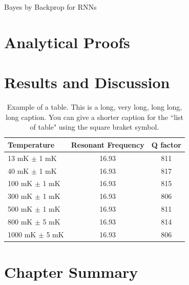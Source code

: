 \begin{algorithm}[ht]
	\caption{Bayes by Backprop for RNNs}
	\label{alg:rnnbbb}
	\begin{algorithmic}
	\end{algorithmic}
\end{algorithm}

\section{Analytical Proofs}


\section{Results and Discussion}


\begin{table}[p]
	\centering
	\caption[Short version of the caption.]{Example of a table. This is a long, very long, long long, long caption.  You can give a shorter caption for the ``list of table" using the square braket symbol.}
	\vspace{\baselineskip}
	\begin{tabular}{l c c}
		\hline
		\hline
		Temperature & Resonant Frequency & Q factor\\
		\hline
		13 mK $\pm$ 1 mK & 16.93 & 811 \\
		40 mK $\pm$ 1 mK & 16.93 & 817 \\
		100 mK $\pm$ 1 mK & 16.93 & 815 \\
		300 mK $\pm$ 1 mK & 16.93 & 806\\
		500 mK $\pm$ 1 mK & 16.93 & 811\\
		800 mK $\pm$ 5 mK & 16.93 & 814\\
		1000 mK $\pm$ 5 mK & 16.93 & 806 \\
		\hline
		\hline
	\end{tabular}
\end{table}

\section{Chapter Summary}